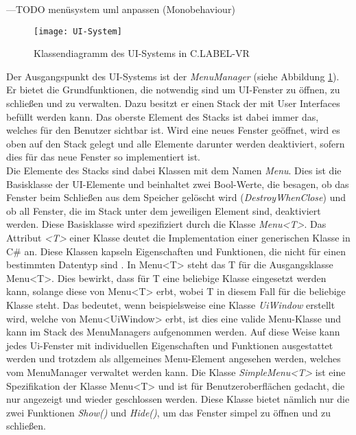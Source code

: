 ---TODO menüsystem uml anpassen (Monobehaviour)

\begin{figure}%
	\centering
    \texttt{[image: UI-System]}
    \caption{Klassendiagramm des UI-Systems in C.LABEL-VR}
    \label{fig:UI-System}
\end{figure}

Der Ausgangspunkt des UI-Systems ist der \textit{MenuManager} (siehe Abbildung \ref{fig:UI-System}). Er bietet die Grundfunktionen, die notwendig sind um UI-Fenster zu öffnen, zu schließen und zu verwalten. Dazu besitzt er einen Stack der mit User Interfaces befüllt werden kann. Das oberste Element des Stacks ist dabei immer das, welches für den Benutzer sichtbar ist. Wird eine neues Fenster geöffnet, wird es oben auf den Stack gelegt und alle Elemente darunter werden deaktiviert, sofern dies für das neue Fenster so implementiert ist.\\

Die Elemente des Stacks sind dabei Klassen mit dem Namen \textit{Menu}. Dies ist die Basisklasse der UI-Elemente und beinhaltet zwei Bool-Werte, die besagen, ob das Fenster beim Schließen aus dem Speicher gelöscht wird (\textit{DestroyWhenClose}) und ob all Fenster, die im Stack unter dem jeweiligen Element sind, deaktiviert werden. Diese Basisklasse wird spezifiziert durch die Klasse \textit{Menu<T>}. Das Attribut \textit{<T>} einer Klasse deutet die Implementation einer generischen Klasse in C\# an. Diese Klassen kapseln Eigenschaften und Funktionen, die nicht für einen bestimmten Datentyp sind \cite{bib:Generics}. In Menu<T> steht das T für die Ausgangsklasse Menu<T>. Dies bewirkt, dass für T eine beliebige Klasse eingesetzt werden kann, solange diese von Menu<T> erbt, wobei T in diesem Fall für die beliebige Klasse steht. Das bedeutet, wenn beispielsweise eine Klasse \textit{UiWindow} erstellt wird, welche von Menu<UiWindow> erbt, ist dies eine valide Menu-Klasse und kann im Stack des MenuManagers aufgenommen werden. Auf diese Weise kann jedes Ui-Fenster mit individuellen Eigenschaften und Funktionen ausgestattet werden und trotzdem als allgemeines Menu-Element angesehen werden, welches vom MenuManager verwaltet werden kann. Die Klasse \textit{SimpleMenu<T>} ist eine Spezifikation der Klasse Menu<T> und ist für Benutzeroberflächen gedacht, die nur angezeigt und wieder geschlossen werden. Diese Klasse bietet nämlich nur die zwei Funktionen \textit{Show()} und \textit{Hide()}, um das Fenster simpel zu öffnen und zu schließen.\\

